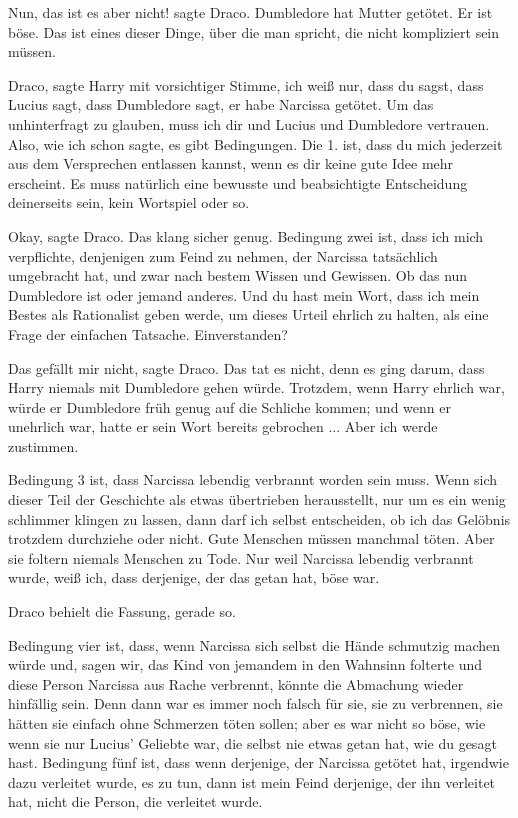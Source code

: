 \glqq{}Nun, das ist es aber nicht!\grqq{} sagte Draco. \glqq{}Dumbledore hat
Mutter getötet. Er ist böse. Das ist eines dieser Dinge, über die man spricht,
die nicht kompliziert sein müssen.\grqq{}

\glqq{}Draco\grqq{}, sagte Harry mit vorsichtiger Stimme, \glqq{}ich weiß nur,
dass du sagst, dass Lucius sagt, dass Dumbledore sagt, er habe Narcissa getötet.
Um das unhinterfragt zu glauben, muss ich dir und Lucius und Dumbledore
vertrauen. Also, wie ich schon sagte, es gibt Bedingungen. Die 1. ist, dass du
mich jederzeit aus dem Versprechen entlassen kannst, wenn es dir keine gute Idee
mehr erscheint. Es muss natürlich eine bewusste und beabsichtigte Entscheidung
deinerseits sein, kein Wortspiel oder so.\grqq{}

\glqq{}Okay\grqq{}, sagte Draco. Das klang sicher genug. \glqq{}Bedingung zwei
ist, dass ich mich verpflichte, denjenigen zum Feind zu nehmen, der Narcissa
tatsächlich umgebracht hat, und zwar nach bestem Wissen und Gewissen. Ob das nun
Dumbledore ist oder jemand anderes. Und du hast mein Wort, dass ich mein Bestes
als Rationalist geben werde, um dieses Urteil ehrlich zu halten, als eine Frage
der einfachen Tatsache. Einverstanden?\grqq{}

\glqq{}Das gefällt mir nicht\grqq{}, sagte Draco. Das tat es nicht, denn es ging
darum, dass Harry niemals mit Dumbledore gehen würde. Trotzdem, wenn Harry
ehrlich war, würde er Dumbledore früh genug auf die Schliche kommen; und wenn er
unehrlich war, hatte er sein Wort bereits gebrochen ... \glqq{}Aber ich werde
zustimmen.\grqq{}

\glqq{}Bedingung 3 ist, dass Narcissa lebendig verbrannt worden sein muss. Wenn
sich dieser Teil der Geschichte als etwas übertrieben herausstellt, nur um es
ein wenig schlimmer klingen zu lassen, dann darf ich selbst entscheiden, ob ich
das Gelöbnis trotzdem durchziehe oder nicht. Gute Menschen müssen manchmal
töten. Aber sie foltern niemals Menschen zu Tode. Nur weil Narcissa lebendig
verbrannt wurde, weiß ich, dass derjenige, der das getan hat, böse war.\grqq{}

Draco behielt die Fassung, gerade so.

\glqq{}Bedingung vier ist, dass, wenn Narcissa sich selbst die Hände schmutzig
machen würde und, sagen wir, das Kind von jemandem in den Wahnsinn folterte und
diese Person Narcissa aus Rache verbrennt, könnte die Abmachung wieder hinfällig
sein. Denn dann war es immer noch falsch für sie, sie zu verbrennen, sie hätten
sie einfach ohne Schmerzen töten sollen; aber es war nicht so böse, wie wenn sie
nur Lucius' Geliebte war, die selbst nie etwas getan hat, wie du gesagt hast.
Bedingung fünf ist, dass wenn derjenige, der Narcissa getötet hat, irgendwie
dazu verleitet wurde, es zu tun, dann ist mein Feind derjenige, der ihn
verleitet hat, nicht die Person, die verleitet wurde.\grqq{}


